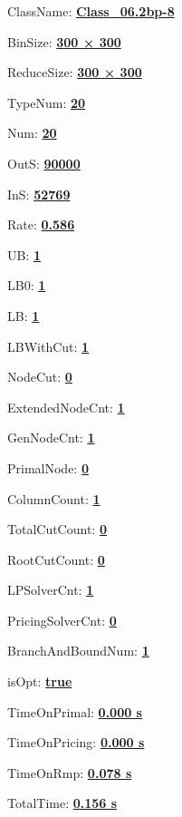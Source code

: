 \documentclass[11pt]{article}
\begin{document}
\pagestyle{empty}


ClassName: \underline{\textbf{Class_06.2bp-8}}
\par
BinSize: \underline{\textbf{300 × 300}}
\par
ReduceSize: \underline{\textbf{300 × 300}}
\par
TypeNum: \underline{\textbf{20}}
\par
Num: \underline{\textbf{20}}
\par
OutS: \underline{\textbf{90000}}
\par
InS: \underline{\textbf{52769}}
\par
Rate: \underline{\textbf{0.586}}
\par
UB: \underline{\textbf{1}}
\par
LB0: \underline{\textbf{1}}
\par
LB: \underline{\textbf{1}}
\par
LBWithCut: \underline{\textbf{1}}
\par
NodeCut: \underline{\textbf{0}}
\par
ExtendedNodeCnt: \underline{\textbf{1}}
\par
GenNodeCnt: \underline{\textbf{1}}
\par
PrimalNode: \underline{\textbf{0}}
\par
ColumnCount: \underline{\textbf{1}}
\par
TotalCutCount: \underline{\textbf{0}}
\par
RootCutCount: \underline{\textbf{0}}
\par
LPSolverCnt: \underline{\textbf{1}}
\par
PricingSolverCnt: \underline{\textbf{0}}
\par
BranchAndBoundNum: \underline{\textbf{1}}
\par
isOpt: \underline{\textbf{true}}
\par
TimeOnPrimal: \underline{\textbf{0.000 s}}
\par
TimeOnPricing: \underline{\textbf{0.000 s}}
\par
TimeOnRmp: \underline{\textbf{0.078 s}}
\par
TotalTime: \underline{\textbf{0.156 s}}
\par
\newpage
\end{document}
